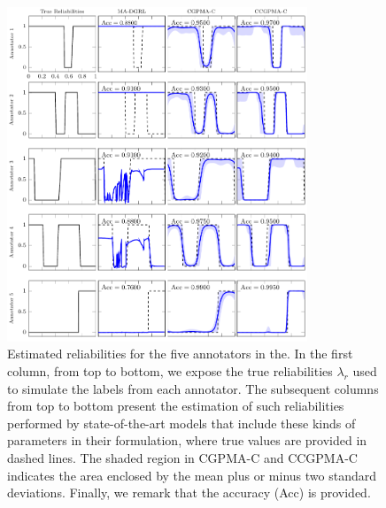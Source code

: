 \documentclass[journal]{IEEEtran}
\begin{document}
\begin{figure}[!tb]
	\centering
	\includegraphics[width = 0.8\textwidth]{Figures/VarEXpC.pdf}
	\caption{Estimated reliabilities for the five annotators in the. In the first column, from top to bottom, we expose the true reliabilities $\lambda_r$ used to simulate the labels from each annotator. The subsequent columns from top to bottom present the estimation of such reliabilities performed by state-of-the-art models that include these kinds of parameters in their formulation, where true values are provided in dashed lines. The shaded region in CGPMA-C and CCGPMA-C indicates the area enclosed by the mean plus or minus two standard deviations. Finally, we remark that the accuracy (Acc) is provided.}
	\label{fig:ExpCla}
\end{figure}
\end{document}
